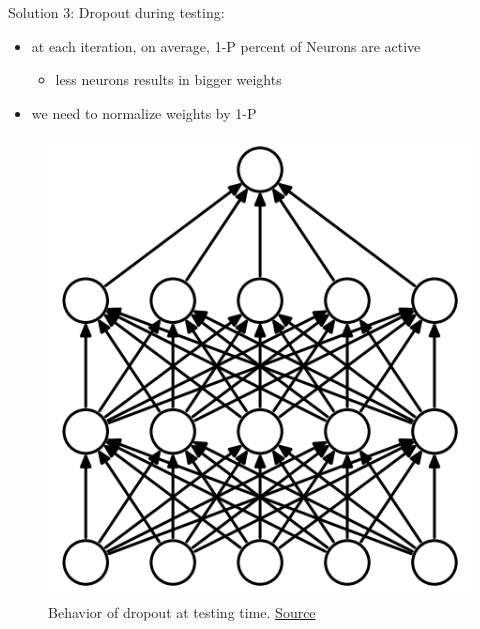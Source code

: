\begin{frame}{Solution 3: Dropout}
	during testing:
	\begin{itemize}
		\item at each iteration, on average, 1-P percent of Neurons are active
		\begin{itemize}
			\item less neurons results in bigger weights
		\end{itemize}
		\item we need to normalize weights by 1-P
	\end{itemize}
	
	\begin{figure}[H]
		\centering
		\includegraphics[height=0.4\textheight]{Figs/Dropout-before.png}
		\caption{Behavior of dropout at testing time. \href{https://www.cs.toronto.edu/~hinton/absps/JMLRdropout.pdf}{Source}}
	\end{figure}
\end{frame}
